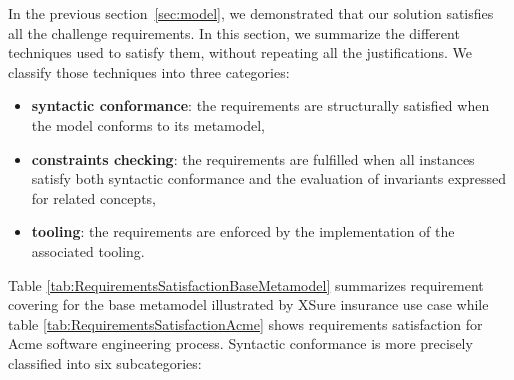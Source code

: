 
In the previous section~\ref{sec:model}, we demonstrated that our solution satisfies all the challenge requirements. In this section, we summarize the different techniques used to satisfy them, without repeating all the justifications. We classify those techniques into three categories: 
\begin{itemize}
    \item \textbf{syntactic conformance}: the requirements are structurally satisfied when the model conforms to its metamodel,
    \item\textbf{constraints checking}: the requirements are fulfilled when all instances satisfy both syntactic conformance and the evaluation of invariants expressed for related concepts,
    \item \textbf{tooling}: the requirements are enforced by the implementation of the associated tooling.
\end{itemize}

Table \ref{tab:RequirementsSatisfactionBaseMetamodel} summarizes requirement covering for the base metamodel illustrated by XSure insurance use case while table \ref{tab:RequirementsSatisfactionAcme} shows requirements satisfaction for Acme software engineering process. Syntactic conformance is more precisely classified into six subcategories:

